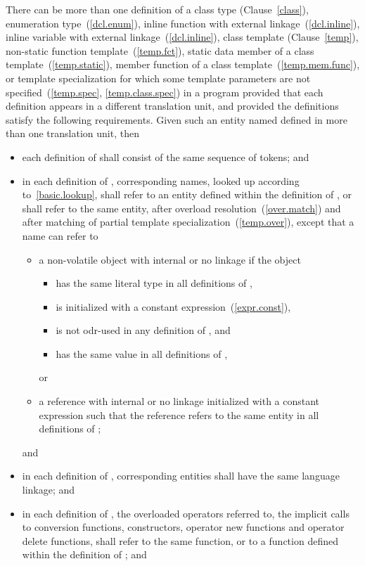 \pnum
There can be more than one definition of a class type
(Clause~\ref{class}), enumeration type~(\ref{dcl.enum}), inline function
with external linkage~(\ref{dcl.inline}), inline variable with external
linkage~(\ref{dcl.inline}), class template
(Clause~\ref{temp}), non-static function template~(\ref{temp.fct}),
static data member of a class template~(\ref{temp.static}), member
function of a class template~(\ref{temp.mem.func}), or template
specialization for which some template parameters are not
specified~(\ref{temp.spec}, \ref{temp.class.spec}) in a program provided
that each definition appears in a different translation unit, and
provided the definitions satisfy the following requirements. Given such
an entity named  defined in more than one translation unit,
then
\begin{itemize}
\item each definition of  shall consist of the same sequence of
tokens; and
\item in each definition of , corresponding names, looked up
according to~\ref{basic.lookup}, shall refer to an entity defined within
the definition of , or shall refer to the same entity, after
overload resolution~(\ref{over.match}) and after matching of partial
template specialization~(\ref{temp.over}), except that a name can refer to
\begin{itemize}
\item
a non-volatile  object with internal or no linkage if the object
\begin{itemize}
\item has the same literal type in all definitions of ,
\item is initialized with a constant expression~(\ref{expr.const}),
\item is not odr-used in any definition of , and
\item has the same value in all definitions of ,
\end{itemize}
or
\item
a reference with internal or no linkage
initialized with a constant expression such that
the reference refers to the same entity in all definitions of ;
\end{itemize}
and

\item in each definition of , corresponding entities shall have the
same language linkage; and

\item in each definition of , the overloaded operators referred
to, the implicit calls to conversion functions, constructors, operator
new functions and operator delete functions, shall refer to the same
function, or to a function defined within the definition of ;
and


\end{itemize}
